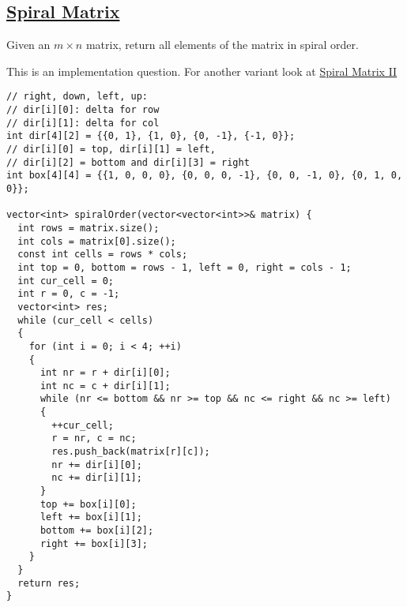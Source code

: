 \documentclass{book}
\begin{document}
	\subsection{\href{https://leetcode.com/problems/spiral-matrix/}{Spiral Matrix}}
	Given an $m \times n$ matrix, return all elements of the matrix in spiral order.
	\par This is an implementation question. For another variant look at \href{https://leetcode.com/problems/spiral-matrix-ii/submissions/}{Spiral Matrix II}
	\begin{lstlisting}
// right, down, left, up: 
// dir[i][0]: delta for row
// dir[i][1]: delta for col
int dir[4][2] = {{0, 1}, {1, 0}, {0, -1}, {-1, 0}};
// dir[i][0] = top, dir[i][1] = left, 
// dir[i][2] = bottom and dir[i][3] = right
int box[4][4] = {{1, 0, 0, 0}, {0, 0, 0, -1}, {0, 0, -1, 0}, {0, 1, 0, 0}};

vector<int> spiralOrder(vector<vector<int>>& matrix) {
  int rows = matrix.size();
  int cols = matrix[0].size();
  const int cells = rows * cols;
  int top = 0, bottom = rows - 1, left = 0, right = cols - 1;
  int cur_cell = 0;
  int r = 0, c = -1;
  vector<int> res;
  while (cur_cell < cells)
  {
    for (int i = 0; i < 4; ++i)
    {
      int nr = r + dir[i][0];
      int nc = c + dir[i][1];
      while (nr <= bottom && nr >= top && nc <= right && nc >= left)
      {
        ++cur_cell;
        r = nr, c = nc;
        res.push_back(matrix[r][c]);
        nr += dir[i][0];
        nc += dir[i][1];
      }
      top += box[i][0];
      left += box[i][1];
      bottom += box[i][2];
      right += box[i][3];
    }
  }
  return res;
}
	\end{lstlisting}
\end{document}
